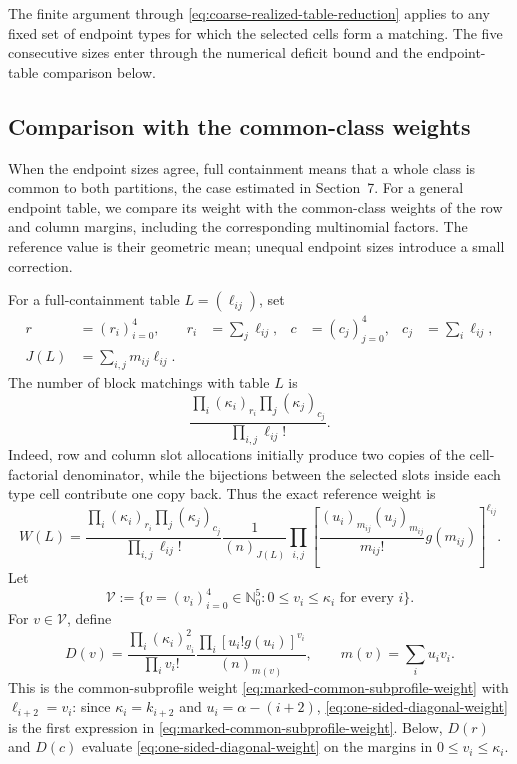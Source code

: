 \documentclass[a4paper,10pt,reqno]{amsart}
\numberwithin{equation}{section}
\theoremstyle{plain}
\theoremstyle{remark}
\begin{document}
The finite argument through
\eqref{eq:coarse-realized-table-reduction} applies to any fixed set of endpoint
types for which the selected cells form a matching.  The five consecutive sizes
enter through the numerical deficit bound and the endpoint-table comparison
below.

\subsection{Comparison with the common-class weights}

When the endpoint sizes agree, full
containment means that a whole class is common to both partitions, the
case estimated in Section~7. For a general endpoint table, we compare its
weight with the common-class weights of the row and column margins,
including the corresponding multinomial factors. The reference value is
their geometric mean; unequal endpoint sizes introduce a small correction.

For a full-containment table $L=(\ell_{ij})$, set
\[
\begin{aligned}
  r&=(r_i)_{i=0}^4,& r_i&=\sum_j\ell_{ij},&
  c&=(c_j)_{j=0}^4,& c_j&=\sum_i\ell_{ij},\\
  J(L)&=\sum_{i,j}m_{ij}\ell_{ij}.
\end{aligned}
\]
The number of block matchings with table $L$ is
\[
 \frac{\prod_i(\kappa_i)_{r_i}\prod_j(\kappa_j)_{c_j}}
      {\prod_{i,j}\ell_{ij}!}.
\]
Indeed, row and column slot allocations initially produce two copies of the
cell-factorial denominator, while the bijections between the selected slots
inside each type cell contribute one copy back.  Thus the exact reference
weight is
\begin{equation}
  W(L)=
  \frac{\prod_i(\kappa_i)_{r_i}\prod_j(\kappa_j)_{c_j}}
       {\prod_{i,j}\ell_{ij}!}
  \frac1{(n)_{J(L)}}
  \prod_{i,j}
  \left[
    \frac{(u_i)_{m_{ij}}(u_j)_{m_{ij}}}{m_{ij}!}g(m_{ij})
  \right]^{\ell_{ij}}.
  \label{eq:endpoint-reference-weight}
\end{equation}
Let
\[
  \mathcal V:=
  \{v=(v_i)_{i=0}^4\in\mathbb N_0^5:0\le v_i\le\kappa_i
    \text{ for every }i\}.
\]
For $v\in\mathcal V$, define
\begin{equation}
  D(v)=
  \frac{\prod_i(\kappa_i)_{v_i}^2}{\prod_i v_i!}
  \frac{\prod_i[u_i!g(u_i)]^{v_i}}{(n)_{m(v)}},
  \qquad
  m(v)=\sum_i u_iv_i.
  \label{eq:one-sided-diagonal-weight}
\end{equation}
This is the common-subprofile weight
\eqref{eq:marked-common-subprofile-weight} with $\ell_{i+2}=v_i$: since
$\kappa_i=k_{i+2}$ and $u_i=\alpha-(i+2)$,
\eqref{eq:one-sided-diagonal-weight} is the first expression in
\eqref{eq:marked-common-subprofile-weight}.
Below, $D(r)$ and $D(c)$ evaluate
\eqref{eq:one-sided-diagonal-weight} on the margins in
$0\le v_i\le\kappa_i$.
\end{document}
